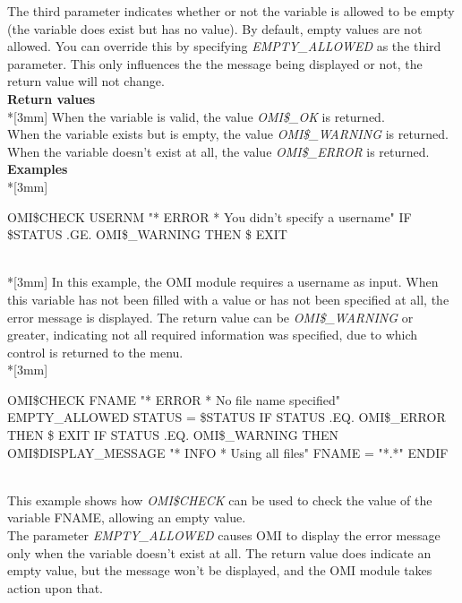 \documentclass[a4paper]{book}
\renewcommand{\indent}{\hspace*{5mm}}
\begin{document}
The third parameter indicates whether or not the variable is allowed to be 
empty (the variable does exist but has no value). By default, empty values 
are not allowed. You can override this by specifying \textsl{EMPTY{\_}ALLOWED} as the 
third parameter. This only influences the the message being displayed or not, the
return value will not change.\\[3mm]
\textbf{Return values}\\*[3mm]
When the variable is valid, the value \textsl{OMI{\$}{\_}OK} is returned. \\
When the variable exists but is empty, the value \textsl{OMI{\$}{\_}WARNING} is 
returned. When the variable doesn't exist at all, the value \textsl{OMI{\$}{\_}ERROR} 
is returned.\\[3mm]
\textbf{Examples}\\*[3mm]
\begin{textsf}
\indent{\$} OMI{\$}CHECK USERNM "* ERROR * You didn't specify a username" \newline
\indent{\$} IF {\$}STATUS .GE. OMI{\$}{\_}WARNING THEN {\$} EXIT
\end{textsf}\\*[3mm]
In this example, the OMI module requires a username as input. When this 
variable has not been filled with a value or has not been specified at all, 
the error message is displayed. The return value can be \textsl{OMI{\$}{\_}WARNING} 
or greater, indicating not all required information was specified, due to 
which control is returned to the menu.\\*[3mm]
\begin{small}
\begin{textsf}
\indent{\$} OMI{\$}CHECK FNAME "* ERROR * No file name specified" EMPTY{\_}ALLOWED \newline
\indent{\$} STATUS = {\$}STATUS \newline
\indent{\$} IF STATUS .EQ. OMI{\$}{\_}ERROR THEN {\$} EXIT \newline
\indent{\$} IF STATUS .EQ. OMI{\$}{\_}WARNING \newline
\indent{\$} THEN \newline
\indent{\$} OMI{\$}DISPLAY{\_}MESSAGE "* INFO * Using all files" \newline
\indent{\$} FNAME = "*.*" \newline
\indent{\$} ENDIF \newline
\end{textsf}
\end{small}\\[3mm]
This example shows how \textsl{OMI{\$}CHECK} can be used to check the value of the variable FNAME, 
allowing an empty value. \\
The parameter \textsl{EMPTY{\_}ALLOWED} causes OMI to display the error message only 
when the variable doesn't exist at all. The return value does indicate an 
empty value, but the message won't be displayed, and the OMI module takes 
action upon that.
\end{document}
